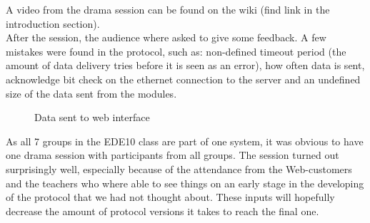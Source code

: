 A video from the drama session can be found on the wiki (find link in the introduction section).
\\[0.2cm]
After the session, the audience where asked to give some feedback. A few mistakes were found in the protocol, such as: non-defined timeout period (the amount of data delivery tries before it is seen as an error), how often data is sent, acknowledge bit check on the ethernet connection to the server and an undefined size of the data sent from the modules. 

\begin{figure}[H]
  \centering
  \hspace{0.2cm}                
  \caption{Data sent to web interface}
  \label{fig:drama_data_to_web}
\end{figure}

As all 7 groups in the EDE10 class are part of one system, it was obvious to have one drama session with participants from all groups. The session turned out surprisingly well, especially because of the attendance from the Web-customers and the teachers who where able to see things on an early stage in the developing of the protocol that we had not thought about. These inputs will hopefully decrease the amount of protocol versions it takes to reach the final one.

